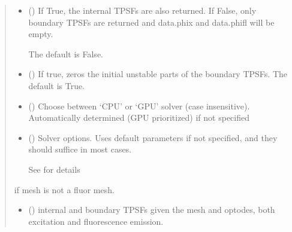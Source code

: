 \documentclass[letterpaper,10pt,english]{sphinxmanual}
\begin{document}
\begin{fulllineitems}
\begin{quote}
\begin{description}
\begin{itemize}
\item {} 
\sphinxAtStartPar
{} (\sphinxstyleliteralemphasis{\sphinxupquote{, }}) \textendash{} 
\sphinxAtStartPar
If True, the internal TPSFs are also returned. If False, only boundary TPSFs are returned and data.phix and data.phifl will be empty.

\sphinxAtStartPar
The default is False.


\item {} 
\sphinxAtStartPar
{} (\sphinxstyleliteralemphasis{\sphinxupquote{, }}) \textendash{} If true, zeros the initial unstable parts of the boundary TPSFs. The default is True.

\item {} 
\sphinxAtStartPar
{} (\sphinxstyleliteralemphasis{\sphinxupquote{, }}) \textendash{} Choose between ‘CPU’ or ‘GPU’ solver (case insensitive). Automatically determined (GPU prioritized) if not specified

\item {} 
\sphinxAtStartPar
{} ({\hyperref[\detokenize{_autosummary/nirfasterff.utils.SolverOptions:nirfasterff.utils.SolverOptions}]{}}\sphinxstyleliteralemphasis{\sphinxupquote{, }}) \textendash{} 
\sphinxAtStartPar
Solver options. Uses default parameters if not specified, and they should suffice in most cases.

\sphinxAtStartPar
See {\hyperref[\detokenize{_autosummary/nirfasterff.utils.SolverOptions:nirfasterff.utils.SolverOptions}]{}} for details


\end{itemize}

\sphinxAtStartPar
{} \textendash{} if mesh is not a fluor mesh.

\sphinxAtStartPar
\begin{itemize}
\item {} 
\sphinxAtStartPar
{} () \textendash{} internal and boundary TPSFs given the mesh and optodes, both excitation and fluorescence emission.


\end{itemize}
\end{description}
\end{quote}
\end{fulllineitems}
\end{document}
